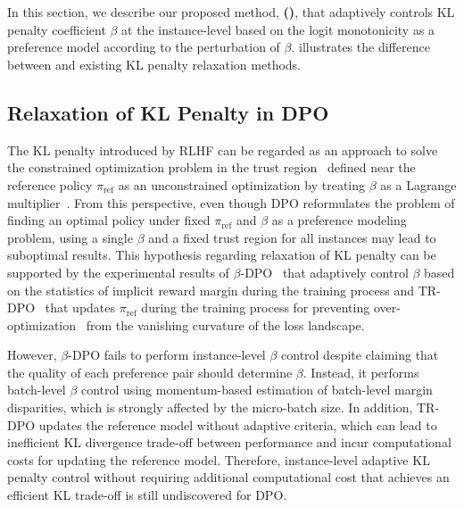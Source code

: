 \section{\methodsfull{}}
In this section, we describe our proposed method, \textbf{\methodbfull{} (\methodb{})}, that adaptively controls KL penalty coefficient $\beta$ at the instance-level based on the logit monotonicity as a preference model according to the perturbation of $\beta$.  illustrates the difference between \method{} and existing KL penalty relaxation methods.

\subsection{Relaxation of KL Penalty in DPO}
The KL penalty introduced by RLHF can be regarded as an approach to solve the constrained optimization problem in the trust region~\cite{schulman2015trust} defined near the reference policy $\pi_\text{ref}$ as an unconstrained optimization by treating $\beta$ as a Lagrange multiplier~\cite{schulman2017proximal}. From this perspective, even though DPO reformulates the problem of finding an optimal policy under fixed $\pi_\text{ref}$ and $\beta$ as a preference modeling problem, using a single $\beta$ and a fixed trust region for all instances may lead to suboptimal results. This hypothesis regarding relaxation of KL penalty can be supported by the experimental results of $\beta$-DPO~\cite{wu2024beta} that adaptively control $\beta$ based on the statistics of implicit reward margin during the training process and TR-DPO~\cite{gorbatovski2024learn} that updates $\pi_{\text{ref}}$ during the training process for preventing over-optimization~\cite{rafailov2024scaling} from the vanishing curvature of the loss landscape.

However, $\beta$-DPO fails to perform instance-level $\beta$ control despite claiming that the quality of each preference pair should determine $\beta$. Instead, it performs batch-level $\beta$ control using momentum-based estimation of batch-level margin disparities, which is strongly affected by the micro-batch size. In addition, TR-DPO updates the reference model without adaptive criteria, which can lead to inefficient KL divergence trade-off between performance and incur computational costs for updating the reference model. Therefore, instance-level adaptive KL penalty control without requiring additional computational cost that achieves an efficient KL trade-off is still undiscovered for DPO.

